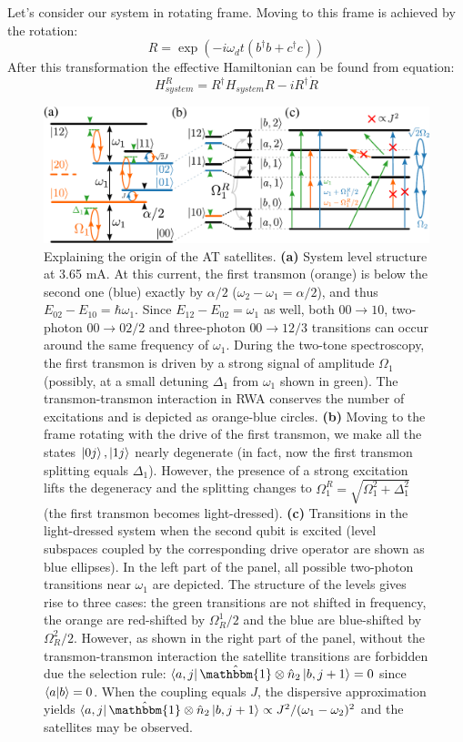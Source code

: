 \documentclass[%
 aip,
 amsmath,amssymb,
 reprint,%
]{revtex4-1}
\begin{document}
Let's consider our system in rotating frame. Moving to this frame is achieved by the rotation:
\begin{equation}
R = \exp(-i\omega_d t (b^{\dagger}b+c^{\dagger}c))
\end{equation}  
After this transformation the effective Hamiltonian can be found from equation:
\begin{equation}
H_{system}^R = R^{\dagger}H_{system}R-iR^{\dagger}\dot{R}
\end{equation}

\begin{figure}
	\centering
	\includegraphics[width=.9\linewidth]{main_scheme}
	\caption{Explaining the origin of the AT satellites. \textbf{(a)} System level structure at 3.65 mA. At this current, the first transmon (orange) is below the second one (blue) exactly by $\alpha/2$ ($\omega_2 - \omega_1 = \alpha/2$), and thus $E_{02} - E_{10} = \hbar\omega_1$. Since $E_{12} - E_{02} = \omega_1$ as well, both $00\rightarrow 10$, two-photon $00 \rightarrow 02/2$ and three-photon $00\rightarrow 12/3$ transitions can occur around the same frequency of $\omega_1$. During the two-tone spectroscopy, the first transmon is driven by a strong signal of amplitude $\Omega_1$ (possibly, at a small detuning $\Delta_1$ from $\omega_1$ shown in green). The transmon-transmon interaction in RWA conserves the number of excitations and is depicted as orange-blue circles. \textbf{(b)} Moving to the frame rotating with the drive of the first transmon, we make all the states $\ket{0j},\ket{1j}$ nearly degenerate (in fact, now the first transmon splitting equals $\Delta_1$). However, the presence of a strong excitation lifts the degeneracy and the splitting changes to $\Omega_1^R = \sqrt{\Omega_1^2 + \Delta_1^2}$ (the first transmon becomes light-dressed). \textbf{(c)} Transitions in the light-dressed system when the second qubit is excited (level subspaces coupled by the corresponding drive operator are shown as blue ellipses). In the left part of the panel, all possible two-photon transitions near $\omega_1$ are depicted. The structure of the levels gives rise to three cases: the green transitions are not shifted in frequency, the orange are red-shifted by $\Omega_R^1/2$ and the blue are blue-shifted by $\Omega_R^2/2$. However, as shown in the right part of the panel, without the transmon-transmon interaction the satellite transitions are forbidden due the selection rule: $\bra{a,j}\hat{\mathbbm{1}}\otimes \hat n_2 \ket{b, j+1} = 0$ since $\braket{a}{b} = 0$. When the coupling equals $J$, the dispersive approximation yields $\bra{a,j}\hat{\mathbbm{1}}\otimes \hat n_2\ket{b, j+1}\propto J^2/(\omega_1-\omega_2)^2$ and the satellites may be observed.}
\end{figure}
\end{document}
